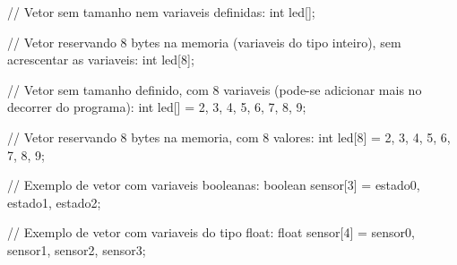 // Vetor sem tamanho nem variaveis definidas:
int led[];

// Vetor reservando 8 bytes na memoria (variaveis do tipo inteiro), sem acrescentar as variaveis:
int led[8];

// Vetor sem tamanho definido, com 8 variaveis (pode-se adicionar mais no decorrer do programa):
int led[] = {2, 3, 4, 5, 6, 7, 8, 9};

// Vetor reservando 8 bytes na memoria, com 8 valores:
int led[8] = {2, 3, 4, 5, 6, 7, 8, 9};

// Exemplo de vetor com variaveis booleanas:
boolean sensor[3] = {estado0, estado1, estado2};

// Exemplo de vetor com variaveis do tipo float:
float sensor[4] = {sensor0, sensor1, sensor2, sensor3};